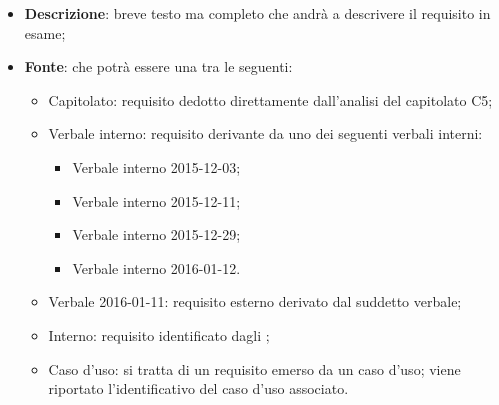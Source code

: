 \begin{itemize}
	\item \textbf{Descrizione}: breve testo ma completo che andrà a descrivere il requisito in esame;
	\item \textbf{Fonte}: che potrà essere una tra le seguenti:
	\begin{itemize}
		\item Capitolato: requisito dedotto direttamente dall'analisi del capitolato C5;
		\item Verbale interno: requisito derivante da uno dei seguenti verbali interni:
		\begin{itemize}
		\item Verbale interno 2015-12-03;
		\item Verbale interno 2015-12-11;
		\item Verbale interno 2015-12-29;
		\item Verbale interno 2016-01-12.
		\end{itemize}
		\item Verbale 2016-01-11: requisito esterno derivato dal suddetto verbale;
		\item Interno: requisito identificato dagli \textit{\Anas};
		\item Caso d’uso: si tratta di un requisito emerso da un caso d’uso; viene riportato l’identificativo del caso d’uso associato.
	\end{itemize} 
\end{itemize}
%



